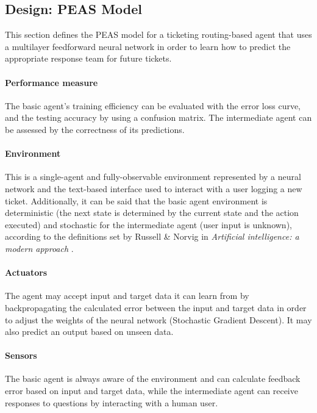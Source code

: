 \documentclass[letterpaper,12pt]{article}
\begin{document}
\subsection{Design: PEAS Model}

This section defines the PEAS model for a ticketing routing-based agent that uses a multilayer feedforward neural network in order to learn how to predict the appropriate response team for future tickets.

\paragraph{Performance measure}\label{sec:performance-measures} The basic agent's training efficiency can be evaluated with the error loss curve, and the testing accuracy by using a confusion matrix. The intermediate agent can be assessed by the correctness of its predictions.

\paragraph{Environment} This is a single-agent and fully-observable environment represented by a neural network and the text-based interface used to interact with a user logging a new ticket. Additionally, it can be said that the basic agent environment is deterministic (the next state is determined by the current state and the action executed) and stochastic for the intermediate agent (user input is unknown), according to the definitions set by Russell \& Norvig in \textit{Artificial intelligence: a modern approach} \cite{russell2016artificial}.

\paragraph{Actuators} The agent may accept input and target data it can learn from by backpropagating the calculated error between the input and target data in order to adjust the weights of the neural network (Stochastic Gradient Descent). It may also predict an output based on unseen data.

\paragraph{Sensors} The basic agent is always aware of the environment and can calculate feedback error based on input and target data, while the intermediate agent can receive responses to questions by interacting with a human user.
\end{document}
